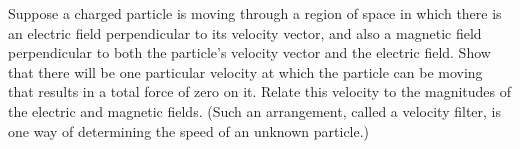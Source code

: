 Suppose a charged particle is moving through a
        region of space in which there is an electric field
        perpendicular to its velocity vector, and also a magnetic
        field perpendicular to both the particle's velocity vector
        and the electric field.  Show that there will be one
        particular velocity at which the particle can be moving that
        results in a total force of zero on it.  Relate this
        velocity to the magnitudes of the electric and magnetic
        fields.  (Such an arrangement, called a velocity filter, is
        one way of determining the speed of an unknown particle.)
